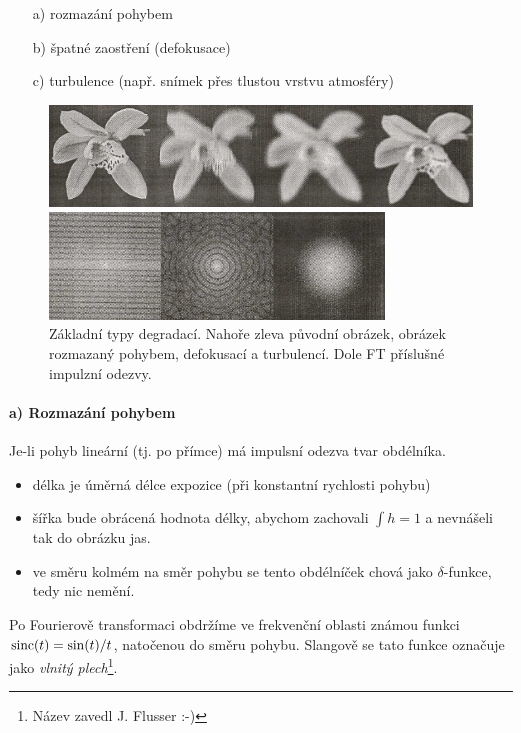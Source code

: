 \begin{itemize}
\item[a)] rozmazání pohybem
\item[b)] špatné zaostření (defokusace)
\item[c)] turbulence (např. snímek přes tlustou vrstvu atmosféry)
\end{itemize}

\begin{figure}
\centering
\includegraphics[width=12cm]{picture/png/screenshot001}

\hspace*{3.1cm}\includegraphics[width=8.9cm]{picture/png/screenshot002}
\caption{Základní typy degradací. Nahoře zleva původní obrázek, obrázek rozmazaný pohybem, defokusací a turbulencí. Dole FT příslušné impulzní odezvy.}
\label{fig:screenshot001}
\end{figure}


\paragraph{a) Rozmazání pohybem} Je-li pohyb lineární (tj. po přímce) má impulsní odezva tvar obdélníka. 
\begin{itemize}
\item délka je úměrná délce expozice (při konstantní rychlosti pohybu)
\item šířka bude obrácená hodnota délky, abychom zachovali $\int h=1$ a nevnášeli tak do obrázku
jas. 
\item ve směru kolmém na směr pohybu se tento obdélníček chová jako $\delta$-funkce, tedy nic nemění. 
\end{itemize}

Po Fourierově transformaci obdržíme ve frekvenční oblasti známou funkci $\operatorname{sinc}(t) = \sin(t)/t$, natočenou do směru pohybu. 
Slangově se tato funkce označuje jako \emph{vlnitý plech}\footnote{Název zavedl J. Flusser :-)}. 

